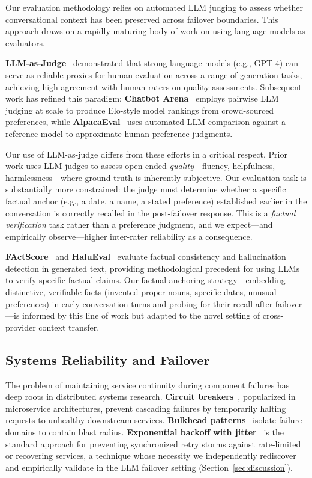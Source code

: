 Our evaluation methodology relies on automated LLM judging to assess whether conversational context has been preserved across failover boundaries. This approach draws on a rapidly maturing body of work on using language models as evaluators.

\textbf{LLM-as-Judge}~\cite{zheng2023judging} demonstrated that strong language models (e.g., GPT-4) can serve as reliable proxies for human evaluation across a range of generation tasks, achieving high agreement with human raters on quality assessments. Subsequent work has refined this paradigm: \textbf{Chatbot Arena}~\cite{chiang2024chatbot} employs pairwise LLM judging at scale to produce Elo-style model rankings from crowd-sourced preferences, while \textbf{AlpacaEval}~\cite{alpacaeval} uses automated LLM comparison against a reference model to approximate human preference judgments.

Our use of LLM-as-judge differs from these efforts in a critical respect. Prior work uses LLM judges to assess open-ended \textit{quality}---fluency, helpfulness, harmlessness---where ground truth is inherently subjective. Our evaluation task is substantially more constrained: the judge must determine whether a specific factual anchor (e.g., a date, a name, a stated preference) established earlier in the conversation is correctly recalled in the post-failover response. This is a \textit{factual verification} task rather than a preference judgment, and we expect---and empirically observe---higher inter-rater reliability as a consequence.

\textbf{FActScore}~\cite{min2023factscore} and \textbf{HaluEval}~\cite{halueval} evaluate factual consistency and hallucination detection in generated text, providing methodological precedent for using LLMs to verify specific factual claims. Our factual anchoring strategy---embedding distinctive, verifiable facts (invented proper nouns, specific dates, unusual preferences) in early conversation turns and probing for their recall after failover---is informed by this line of work but adapted to the novel setting of cross-provider context transfer.

\subsection{Systems Reliability and Failover}

The problem of maintaining service continuity during component failures has deep roots in distributed systems research. \textbf{Circuit breakers}~\cite{nygard2007release}, popularized in microservice architectures, prevent cascading failures by temporarily halting requests to unhealthy downstream services. \textbf{Bulkhead patterns}~\cite{nygard2007release} isolate failure domains to contain blast radius. \textbf{Exponential backoff with jitter}~\cite{aws-backoff} is the standard approach for preventing synchronized retry storms against rate-limited or recovering services, a technique whose necessity we independently rediscover and empirically validate in the LLM failover setting (Section~\ref{sec:discussion}).

